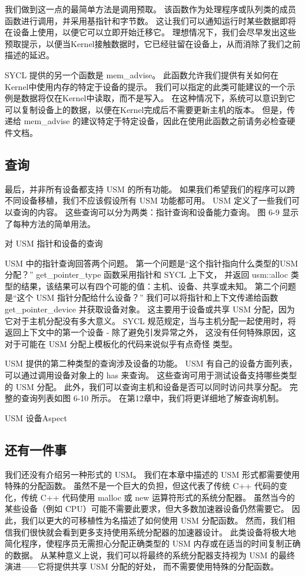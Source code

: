 我们做到这一点的最简单方法是调用预取。 该函数作为处理程序或队列类的成员函数进行调用，并采用基指针和字节数。 
这让我们可以通知运行时某些数据即将在设备上使用，以便它可以立即开始迁移它。 
理想情况下，我们会尽早发出这些预取提示，以便当Kernel接触数据时，它已经驻留在设备上，从而消除了我们之前描述的延迟。

SYCL 提供的另一个函数是 mem\_advise。 此函数允许我们提供有关如何在Kernel中使用内存的特定于设备的提示。 
我们可以指定的此类可能建议的一个示例是数据将仅在Kernel中读取，而不是写入。 
在这种情况下，系统可以意识到它可以复制设备上的数据，以便在Kernel完成后不需要更新主机的版本。 
但是，传递给 mem\_advise 的建议特定于特定设备，因此在使用此函数之前请务必检查硬件文档。

\subsection{查询}
最后，并非所有设备都支持 USM 的所有功能。 
如果我们希望我们的程序可以跨不同设备移植，我们不应该假设所有 USM 功能都可用。 
USM 定义了一些我们可以查询的内容。 这些查询可以分为两类：指针查询和设备能力查询。 
图 6-9 显示了每种方法的简单用法。

{\color{red} 对 USM 指针和设备的查询}

USM 中的指针查询回答两个问题。 
第一个问题是“这个指针指向什么类型的USM分配？” get\_pointer\_type 函数采用指针和 SYCL 上下文，
并返回 usm::alloc 类型的结果，该结果可以有四个可能的值：主机、设备、共享或未知。 
第二个问题是“这个 USM 指针分配给什么设备？” 我们可以将指针和上下文传递给函数 get\_pointer\_device 并获取设备对象。 
这主要用于设备或共享 USM 分配，因为它对于主机分配没有多大意义。 
SYCL 规范规定，当与主机分配一起使用时，将返回上下文中的第一个设备 - 除了避免引发异常之外，
这没有任何特殊原因，这对于可能在 USM 分配上模板化的代码来说似乎有点奇怪 类型。

USM 提供的第二种类型的查询涉及设备的功能。 USM 有自己的设备方面列表，可以通过调用设备对象上的 has 来查询。 
这些查询可用于测试设备支持哪些类型的 USM 分配。 此外，我们可以查询主机和设备是否可以同时访问共享分配。 
完整的查询列表如图 6-10 所示。 在第12章中，我们将更详细地了解查询机制。

{\color{red} USM 设备Aspect }

\subsection{还有一件事}
我们还没有介绍另一种形式的 USM。 我们在本章中描述的 USM 形式都需要使用特殊的分配函数。 
虽然不是一个巨大的负担，但这代表了传统 C++ 代码的变化，传统 C++ 代码使用 malloc 或 new 运算符形式的系统分配器。 
虽然当今的某些设备（例如 CPU）可能不需要此要求，但大多数加速器设备仍然需要它。 
因此，我们以更大的可移植性为名描述了如何使用 USM 分配函数。 
然而，我们相信我们很快就会看到更多支持使用系统分配器的加速器设计。 
此类设备将极大地简化程序，使程序员无需担心分配正确类型的 USM 内存或在适当的时间复制正确的数据。 
从某种意义上说，我们可以将最终的系统分配器支持视为 USM 的最终演进——它将提供共享 USM 分配的好处，
而不需要使用特殊的分配函数。

